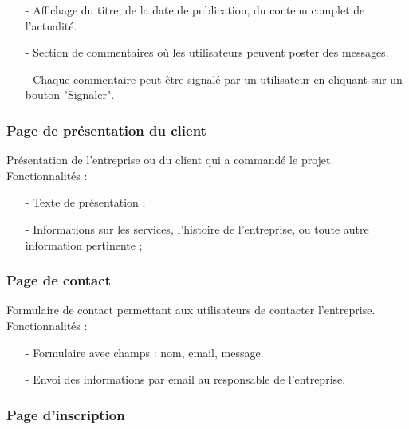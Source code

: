 \documentclass[12pt,a4paper]{article}
\begin{document}
    \begin{itemize}
    	\item[-] Affichage du titre, de la date de publication, du contenu complet de l'actualité.
    	\item[-] Section de commentaires où les utilisateurs peuvent poster des messages.
    	\item[-] Chaque commentaire peut être signalé par un utilisateur en cliquant sur un bouton "Signaler".
    \end{itemize}    

\subsubsection{Page de présentation du client}

    Présentation de l’entreprise ou du client qui a commandé le projet.\\
    
    Fonctionnalités :
    
    \begin{itemize}
    		\item[-] Texte de présentation ;
    		\item[-] Informations sur les services, l’histoire de l’entreprise, ou toute autre information pertinente ;
    \end{itemize}
        
        

\subsubsection{Page de contact}

    Formulaire de contact permettant aux utilisateurs de contacter l’entreprise.\\
    
    Fonctionnalités :
    
    \begin{itemize}
    		\item[-] Formulaire avec champs : nom, email, message.
    		\item[-] Envoi des informations par email au responsable de l'entreprise.
    \end{itemize}
       
       

\subsubsection{Page d’inscription}
\end{document}
